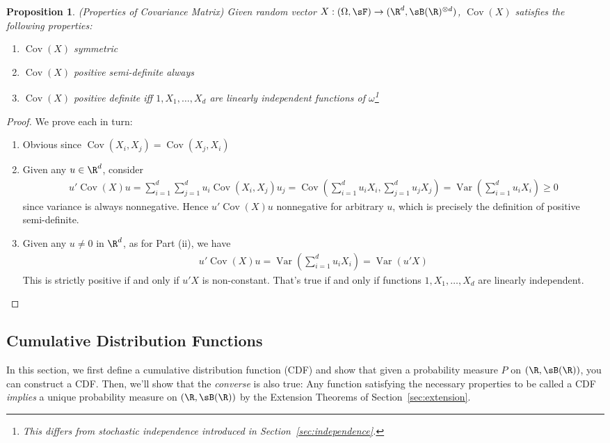\documentclass[12pt]{article}
\theoremstyle{plain}
\newtheorem{prop}[thm]{Proposition}
\theoremstyle{definition}
\theoremstyle{remark}
\newcommand{\ra}{\rightarrow}
\newcommand{\Cov}{\operatorname{Cov}}
\newcommand{\Var}{\operatorname{Var}}
\begin{document}
\begin{prop}\emph{(Properties of Covariance Matrix)}
Given random vector $X:(\Omega,\sF)\ra(\R^d,\sB(\R)^{\otimes d})$,
$\Cov(X)$ satisfies the following properties:
\begin{enumerate}[label=\emph{(\roman*)}]
  \item $\Cov(X)$ symmetric
  \item $\Cov(X)$ positive semi-definite always
  \item $\Cov(X)$ positive definite iff $1,X_1,\ldots,X_d$ are linearly
    independent functions of $\omega$\footnote{%
      This differs from stochastic independence introduced in
      Section~\ref{sec:independence}.
    }
\end{enumerate}
\end{prop}
\begin{proof}
We prove each in turn:
\begin{enumerate}[label=(\roman*)]
  \item Obvious since $\Cov(X_i,X_j)=\Cov(X_j,X_i)$
  \item Given any $u\in \R^d$, consider
    \begin{align*}
      u'\Cov(X)u
      = \sum_{i=1}^d\sum_{j=1}^d
        u_i\Cov(X_i,X_j)u_j
      = \Cov\left( \sum_{i=1}^du_i X_i, \sum_{j=1}^d u_j X_j\right)
      = \Var\left( \sum_{i=1}^du_i X_i\right)
      \geq 0
    \end{align*}
    since variance is always nonnegative.
    Hence $u'\Cov(X)u$ nonnegative for arbitrary $u$, which
    is precisely the definition of positive semi-definite.
  \item
    Given any $u\neq 0$ in $\R^d$, as for Part (ii), we have
    \begin{align*}
      u'\Cov(X)u
      = \Var\left( \sum_{i=1}^du_i X_i\right)
      = \Var(u'X)
    \end{align*}
    This is strictly positive if and only if $u'X$ is non-constant.
    That's true if and only if functions $1,X_1,\ldots,X_d$ are linearly
    independent.
\end{enumerate}
\end{proof}

\clearpage
\subsection{Cumulative Distribution Functions}
\label{sec:cdf}

In this section, we first define a cumulative distribution function
(CDF) and show that given a probability measure $P$ on $(\R,\sB(\R))$,
you can construct a CDF. Then, we'll show that the \emph{converse} is
also true: Any function satisfying the necessary properties to be called
a CDF \emph{implies} a unique probability measure on $(\R,\sB(\R))$ by
the Extension Theorems of Section~\ref{sec:extension}.
\end{document}
